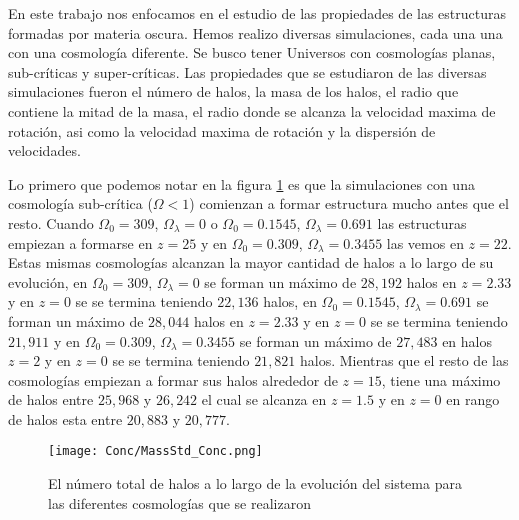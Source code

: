 \renewcommand{\altname}{Conclusiones}
\lhead[\fancyplain{}{}]%
      {\fancyplain{}{\bfseries \altname}}
\addchap{\altname}
En este trabajo nos enfocamos en el estudio de las propiedades de las estructuras formadas por materia oscura. Hemos realizo diversas simulaciones, cada una una con una cosmología diferente. Se busco tener Universos con cosmologías planas, sub-críticas y super-críticas. Las propiedades que se estudiaron de las diversas simulaciones fueron el número de halos, la masa de los halos, el radio que contiene la mitad de la masa, el radio donde se alcanza la velocidad maxima de rotación, asi como la velocidad maxima de rotación y la dispersión de velocidades.

Lo primero que podemos notar en la figura \ref{fig:Conc_TotalHalos} es que la simulaciones con una cosmología sub-crítica ($\Omega < 1$) comienzan a formar estructura mucho antes que el resto. Cuando $\Omega_0 = 309$, $\Omega_\lambda=0$ o $\Omega_0=0.1545$, $\Omega_\lambda=0.691$ las estructuras empiezan a formarse en $z=25$ y en $\Omega_0=0.309$, $\Omega_\lambda=0.3455$ las vemos en $z=22$. Estas mismas cosmologías alcanzan la mayor cantidad de halos a lo largo de su evolución, en $\Omega_0 = 309$, $\Omega_\lambda=0$ se forman un máximo de $28,192$ halos en $z=2.33$ y en $z=0$ se se termina teniendo $22,136$ halos, en $\Omega_0 = 0.1545$, $\Omega_\lambda=0.691$ se forman un máximo de $28,044$ halos en $z=2.33$ y en $z=0$ se se termina teniendo $21,911$ y en $\Omega_0 = 0.309$, $\Omega_\lambda=0.3455$ se forman un máximo de $27,483$ en halos $z=2$ y en $z=0$ se se termina teniendo $21,821$ halos. Mientras que el resto de las cosmologías empiezan a formar sus halos alrededor de $z=15$, tiene una máximo de halos entre $25,968$ y $26,242$ el cual se alcanza en $z=1.5$ y en $z=0$ en rango de halos esta entre $20,883$ y $20,777$.

\begin{figure}
      \centering
      \texttt{[image: Conc/MassStd\_Conc.png]}
      \caption[Evolución del total de halos para todas las cosmologías]{El número total de halos a lo largo de la evolución del sistema para las diferentes cosmologías que se realizaron}
      \label{fig:Conc_TotalHalos}
\end{figure}

